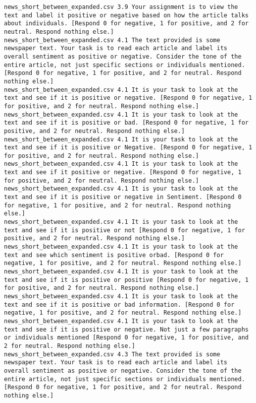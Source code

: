 \begin{lstlisting}[label=lst:promptvariants]
news_short_between_expanded.csv	3.9	Your assignment is to view the text and label it positive or negative based on how the article talks about individuals. [Respond 0 for negative, 1 for positive, and 2 for neutral. Respond nothing else.]
news_short_between_expanded.csv	4.1	The text provided is some newspaper text. Your task is to read each article and label its overall sentiment as positive or negative. Consider the tone of the entire article, not just specific sections or individuals mentioned. [Respond 0 for negative, 1 for positive, and 2 for neutral. Respond nothing else.]
news_short_between_expanded.csv	4.1	It is your task to look at the text and see if it is positive or negative. [Respond 0 for negative, 1 for positive, and 2 for neutral. Respond nothing else.]
news_short_between_expanded.csv	4.1	It is your task to look at the text and see if it is positive or bad. [Respond 0 for negative, 1 for positive, and 2 for neutral. Respond nothing else.]
news_short_between_expanded.csv	4.1	It is your task to look at the text and see if it is positive or Negative. [Respond 0 for negative, 1 for positive, and 2 for neutral. Respond nothing else.]
news_short_between_expanded.csv	4.1	It is your task to look at the text and see if it positive or negative. [Respond 0 for negative, 1 for positive, and 2 for neutral. Respond nothing else.]
news_short_between_expanded.csv	4.1	It is your task to look at the text and see if it is positive or negative in Sentiment. [Respond 0 for negative, 1 for positive, and 2 for neutral. Respond nothing else.]
news_short_between_expanded.csv	4.1	It is your task to look at the text and see if it is positive or not [Respond 0 for negative, 1 for positive, and 2 for neutral. Respond nothing else.]
news_short_between_expanded.csv	4.1	It is your task to look at the text and see which sentiment is positive orbad. [Respond 0 for negative, 1 for positive, and 2 for neutral. Respond nothing else.]
news_short_between_expanded.csv	4.1	It is your task to look at the text and see if it is positive or positive [Respond 0 for negative, 1 for positive, and 2 for neutral. Respond nothing else.]
news_short_between_expanded.csv	4.1	It is your task to look at the text and see if it is positive or bad information. [Respond 0 for negative, 1 for positive, and 2 for neutral. Respond nothing else.]
news_short_between_expanded.csv	4.1	It is your task to look at the text and see if it is positive or negative. Not just a few paragraphs or individuals mentioned [Respond 0 for negative, 1 for positive, and 2 for neutral. Respond nothing else.]
news_short_between_expanded.csv	4.3	The text provided is some newspaper text. Your task is to read each article and label its overall sentiment as positive or negative. Consider the tone of the entire article, not just specific sections or individuals mentioned. [Respond 0 for negative, 1 for positive, and 2 for neutral. Respond nothing else.]

\end{lstlisting}
